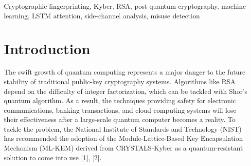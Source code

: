 \documentclass[conference]{IEEEtran}
\begin{document}
\maketitle
\begin{abstract}
The shift from classical cryptography to post-quantum cryptography (PQC) necessitates the development of automated tools that can identify which cryptographic algorithms are being employed in a system, as well as their proper application. We introduce \textbf{CryptoFP}, a machine learning framework that can fingerprint six different types of algorithms: RSA-1024, RSA-2048, RSA-4096, Kyber-512, Kyber-768, Kyber-1024 based on non-invasive side-channel measurements such as execution time and memory usage. We conduct 1{,}800  benchmark experiments on each of the six algorithms, for a total of (10{,}800 total) experiments, and extract 12 features from these measurements.Four classifiers are being evaluated: Random Forest (RF), Support Vector Machine with RBF kernel (SVM), 1-D Convolutional Neural Network (CNN-1D), and a new Bidirectional LSTM using Bahdanau attention mechanism (LSTM+Attn). Out of these SVM achieves best test macro-f1 and ROC-AUC of \textbf{0.889} and \textbf{0.988} respectively. Addiitonally, a misuse detection technique examines the weak-key usage (RSA-1024) and RSA at contexts that require PQC with perfect precision and recall (F1=1.000). The analysis of attention weight shows that the \texttt{memory\_delta\_kb} and \texttt{keygen\_time\_ms} form the most informative features making it possible to explain observed events. In this way, CryptoFP proves the fact that proper side-channel monitoring can be enough for reliable identification of the cryptographic algorithm as well as assessment of PQC readiness.
\end{abstract}

\begin{IEEEkeywords}
Cryptographic fingerprinting, Kyber, RSA, post-quantum cryptography,
machine learning, LSTM attention, side-channel analysis, misuse detection
\end{IEEEkeywords}

\section{Introduction}
The swift growth of quantum computing represents a major danger to the future stability of traditional public-key cryptography systems. Algorithms like RSA depend on the difficulty of integer factorization, which can be tackled with Shor’s quantum algorithm. As a result, the techniques providing safety for electronic communications, banking transactions, and cloud computing systems will lose their effectiveness after a large-scale quantum computer becomes a reality. To tackle the problem, the National Institute of Standards and Technology (NIST) has recommended the adoption of the Module-Lattice-Based Key Encapsulation Mechanism (ML-KEM) derived from CRYSTALS-Kyber as a quantum-resistant solution to come into use [1], [2].
\end{document}
